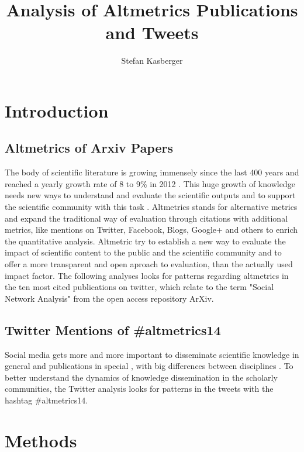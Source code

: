 \documentclass[fleqn,10pt,lineno]{wlpeerj} %
\title{Analysis of Altmetrics Publications and Tweets}
\author[1]{Stefan Kasberger}
\affil[1]{Karl Franzens University of Graz}
\begin{document}
\flushbottom
\maketitle
\thispagestyle{empty}

\section*{Introduction}

\subsection*{Altmetrics of Arxiv Papers}

The body of scientific literature is growing immensely since the last 400 years and reached a yearly growth rate of 8 to 9\% in 2012 \citep{Bornmann2014}. This huge growth of knowledge needs new ways to understand and evaluate the scientific outputs and to support the scientific community with this task \citep{Costas2014}. Altmetrics stands for alternative metrics and expand the traditional way of evaluation through citations with additional metrics, like mentions on Twitter, Facebook, Blogs, Google+ and others to enrich the quantitative analysis. Altmetric try to establish a new way to evaluate the impact of scientific content to the public and the scientific community and to offer a more transparent and open aproach to evaluation, than the actually used impact factor. The following analyses looks for patterns regarding altmetrics in the ten most cited publications on twitter, which relate to the term "Social Network Analysis" from the open access repository ArXiv.

\subsection*{Twitter Mentions of \#altmetrics14}

Social media gets more and more important to disseminate scientific knowledge in general and publications in special \citep{Moriano2014}, with big differences between disciplines \citep{Haustein2014}. To better understand the dynamics of knowledge dissemination in the scholarly communities, the Twitter analysis looks for patterns in the tweets with the hashtag \#altmetrics14.

\section*{Methods}    
   
\end{document}
